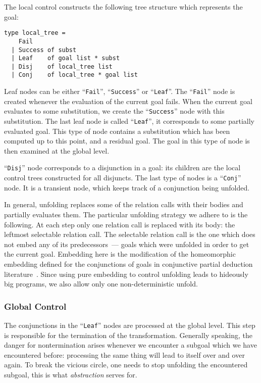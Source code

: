 The local control constructs the following tree structure which represents the goal:

\begin{lstlisting}
type local_tree = 
    Fail
  | Success of subst
  | Leaf    of goal list * subst
  | Disj    of local_tree list
  | Conj    of local_tree * goal list
\end{lstlisting}

Leaf nodes can be either ``\lstinline{Fail}'', ``\lstinline{Success}'' or ``\lstinline{Leaf}''. 
The ``\lstinline{Fail}'' node is created whenever the evaluation of the current goal fails. 
When the current goal evaluates to some substitution, we create the ``\lstinline{Success}'' node with this substitution. 
The last leaf node is called ``\lstinline{Leaf}'', it corresponds to some partially evaluated goal. 
This type of node contains a substitution which has been computed up to this point, and a residual goal.
The goal in this type of node is then examined at the global level. 

``\lstinline{Disj}'' node corresponds to a disjunction in a goal: its children are the local control trees constructed for all disjuncts. 
The last type of nodes is a ``\lstinline{Conj}'' node. 
It is a transient node, which keeps track of a conjunction being unfolded. 

In general, unfolding replaces some of the relation calls with their bodies and partially evaluates them.
The particular unfolding strategy we adhere to is the following. 
At each step only one relation call is replaced with its body: the leftmost selectable relation call.
The selectable relation call is the one which does not embed any of its predecessors~--- goals which were unfolded in order to get the current goal. 
Embedding here is the modification of the homeomorphic embedding defined for the conjunctions of goals in conjunctive partial deduction literature~\cite{de1999conjunctive}. 
Since using pure embedding to control unfolding leads to hideously big programs, we also allow only one non-deterministic unfold.

\subsubsection{Global Control}

The conjunctions in the ``\lstinline{Leaf}'' nodes are processed at the global level. 
This step is responsible for the termination of the transformation. 
Generally speaking, the danger for nontermination arises whenever we encounter a subgoal which we have encountered before: processing the same thing will lead to itself over and over again. 
To break the vicious circle, one needs to stop unfolding the encountered subgoal, this is what \emph{abstraction} serves for.

